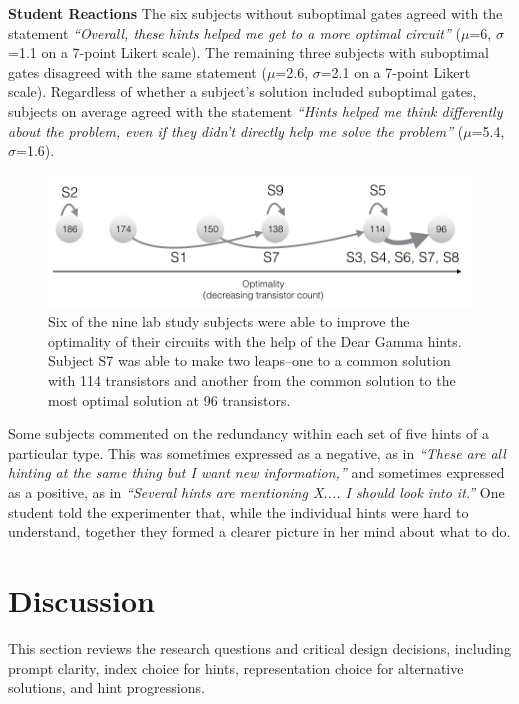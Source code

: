 {\bf Student Reactions} The six subjects without suboptimal gates agreed with the statement {\it ``Overall, these hints helped me get to a more optimal circuit''} ($\mu$=6, $\sigma$=1.1 on a 7-point Likert scale). The remaining three subjects with suboptimal gates disagreed with the same statement ($\mu$=2.6, $\sigma$=2.1 on a 7-point Likert scale). Regardless of whether a subject's solution included suboptimal gates, subjects on average agreed with the statement {\it ``Hints helped me think differently about the problem, even if they didn't directly help me solve the problem'' } ($\mu$=5.4, $\sigma$=1.6).



\begin{figure}
\centering
\includegraphics[width=1.0\columnwidth]{Body/figures/classoverflow/dearGammaResults.png}
\caption{Six of the nine lab study subjects were able to improve the optimality of their circuits with the help of the Dear Gamma hints. Subject S7 was able to make two leaps--one to a common solution with 114 transistors and another from the common solution to the most optimal solution at 96 transistors.}
\label{fig:gammaresults}
\end{figure}

Some subjects commented on the redundancy within each set of five hints of a particular type. This was sometimes expressed as a negative, as in {\it ``These are all hinting at the same thing but I want new information,''} and sometimes expressed as a positive, as in {\it ``Several hints are mentioning X.... I should look into it.''} One student told the experimenter that, while the individual hints were hard to understand, together they formed a clearer picture in her mind about what to do.


\section{Discussion}
This section reviews the research questions and critical design decisions, including prompt clarity, index choice for hints, representation choice for alternative solutions, and hint progressions.

